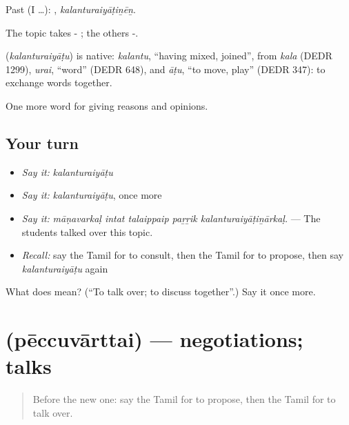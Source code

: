 Past (I …): , \emph{kalanturaiyāṭiṉēṉ}.

The topic takes - ; the others -.

\begin{cousinweb}
\textbf{} (\emph{kalanturaiyāṭu}) is native: \emph{kalantu}, \textquotedblleft{}having mixed, joined\textquotedblright{}, from \emph{kala} (DEDR 1299), \emph{urai}, \textquotedblleft{}word\textquotedblright{} (DEDR 648), and \emph{āṭu}, \textquotedblleft{}to move, play\textquotedblright{} (DEDR 347): to exchange words together.
\end{cousinweb}

\begin{grammarlens}[title={What you've built}]
One more word for giving reasons and opinions.
\end{grammarlens}

\subsection*{Your turn}
\begin{itemize}
\raggedright
  \item \emph{Say it:} \emph{kalanturaiyāṭu}
  \item \emph{Say it:} \emph{kalanturaiyāṭu}, once more
  \item \emph{Say it:} \emph{māṇavarkaḷ intat talaippaip paṟṟik kalanturaiyāṭiṉārkaḷ.} — The students talked over this topic.
  \item \emph{Recall:} say the Tamil for to consult, then the Tamil for to propose, then say \emph{kalanturaiyāṭu} again
\end{itemize}

\begin{tcolorbox}[breakable,colback=teal!4,colframe=teal!35!black,title={Before you move on}]
What does  mean? (\textquotedblleft{}To talk over; to discuss together\textquotedblright{}.) Say it once more.
\end{tcolorbox}
\section[\texorpdfstring{\ta{பேச்சுவார்த்தை} (pēccuvārttai)}{பேச்சுவார்த்தை (pēccuvārttai)}]{ (pēccuvārttai) — negotiations; talks}

\label{lesson:TA-C356-peccuvarttai}



\begin{quote}
Before the new one: say the Tamil for to propose, then the Tamil for to talk over.
\end{quote}

